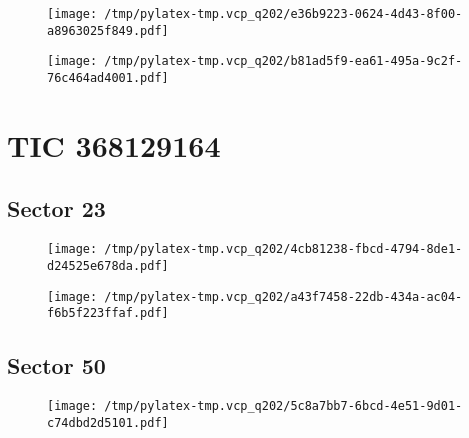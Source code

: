 \documentclass{report}%
\begin{document}
\begin{figure}[H]%
\begin{center}%
\centering%
\texttt{[image: /tmp/pylatex-tmp.vcp\_q202/e36b9223-0624-4d43-8f00-a8963025f849.pdf]}%
\end{center}%
\end{figure}

%


\begin{figure}[H]%
\begin{center}%
\centering%
\texttt{[image: /tmp/pylatex-tmp.vcp\_q202/b81ad5f9-ea61-495a-9c2f-76c464ad4001.pdf]}%
\end{center}%
\end{figure}

%
\section{TIC 368129164}%
\label{sec:TIC368129164}%
\subsection{Sector 23}%
\label{subsec:36812916423}%


\begin{figure}[H]%
\begin{center}%
\centering%
\texttt{[image: /tmp/pylatex-tmp.vcp\_q202/4cb81238-fbcd-4794-8de1-d24525e678da.pdf]}%
\end{center}%
\end{figure}

%


\begin{figure}[H]%
\begin{center}%
\centering%
\texttt{[image: /tmp/pylatex-tmp.vcp\_q202/a43f7458-22db-434a-ac04-f6b5f223ffaf.pdf]}%
\end{center}%
\end{figure}

%
\subsection{Sector 50}%
\label{subsec:36812916450}%


\begin{figure}[H]%
\begin{center}%
\centering%
\texttt{[image: /tmp/pylatex-tmp.vcp\_q202/5c8a7bb7-6bcd-4e51-9d01-c74dbd2d5101.pdf]}%
\end{center}%
\end{figure}
\end{document}
